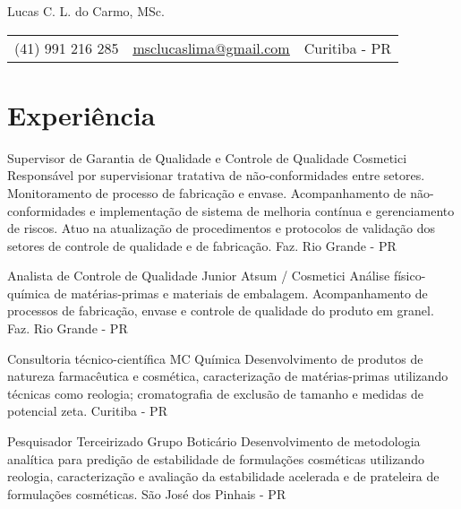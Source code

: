 \pagestyle{fancy} %
\fancyhf{} 
\renewcommand{\headrulewidth}{0pt}


\thispagestyle{empty}

\begin{center}
	
	{\LARGE Lucas C. L. do Carmo, MSc.}
	
	\vspace{6pt}
	\begin{tabular}{c|c|c}
		(41) 991 216 285 & \textcolor{Accent}{\underline{\href{mailto:msclucaslima@gmail.com}{msclucaslima@gmail.com}}} & Curitiba - PR
	\end{tabular}

	\vspace{6pt}
	
\end{center}
	

\section{Experiência}

{Supervisor de Garantia de Qualidade e Controle de Qualidade}
{Cosmetici}
{
	Responsável por supervisionar tratativa de não-conformidades entre setores.
	Monitoramento de processo de fabricação e envase.
	Acompanhamento de não-conformidades e implementação de
	sistema de melhoria contínua e gerenciamento de riscos.
	Atuo na atualização de procedimentos e protocolos de validação dos setores
	de controle de qualidade e de fabricação.
}
{Faz. Rio Grande - PR}

{Analista de Controle de Qualidade Junior}
{Atsum / Cosmetici}
{
	Análise físico-química de matérias-primas e materiais de embalagem.
	Acompanhamento de processos de fabricação, envase e controle de qualidade do
	produto em granel.
}
{Faz. Rio Grande - PR}

{Consultoria técnico-científica}
{MC Química}
{
	Desenvolvimento de produtos de natureza farmacêutica e cosmética, 
	caracterização de matérias-primas utilizando técnicas como reologia;
	cromatografia de exclusão de tamanho e medidas de potencial zeta.
}
{Curitiba - PR}

{Pesquisador Terceirizado}
{Grupo Boticário}
{
	Desenvolvimento de metodologia analítica para predição de estabilidade
	de formulações cosméticas utilizando reologia,
	caracterização e avaliação da estabilidade acelerada e de prateleira
	de formulações cosméticas.
}
{São José dos Pinhais - PR}

